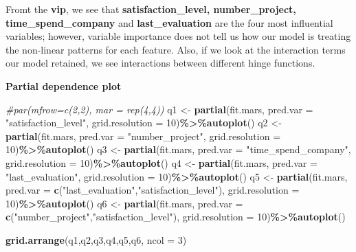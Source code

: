 \documentclass[
  11pt,
]{article}
\newenvironment{Shaded}{\begin{snugshade}}{\end{snugshade}}
\newcommand{\AttributeTok}[1]{\textcolor[rgb]{0.13,0.29,0.53}{#1}}
\newcommand{\CommentTok}[1]{\textcolor[rgb]{0.56,0.35,0.01}{\textit{#1}}}
\newcommand{\DecValTok}[1]{\textcolor[rgb]{0.00,0.00,0.81}{#1}}
\newcommand{\FunctionTok}[1]{\textcolor[rgb]{0.13,0.29,0.53}{\textbf{#1}}}
\newcommand{\NormalTok}[1]{#1}
\newcommand{\OtherTok}[1]{\textcolor[rgb]{0.56,0.35,0.01}{#1}}
\newcommand{\SpecialCharTok}[1]{\textcolor[rgb]{0.81,0.36,0.00}{\textbf{#1}}}
\newcommand{\StringTok}[1]{\textcolor[rgb]{0.31,0.60,0.02}{#1}}
\begin{document}
Fromt the \textbf{vip}, we see that \textbf{satisfaction\_level,
number\_project, time\_spend\_company} and \textbf{last\_evaluation} are
the four most influential variables; however, variable importance does
not tell us how our model is treating the non-linear patterns for each
feature. Also, if we look at the interaction terms our model retained,
we see interactions between different hinge functions.

\hfill\break
\textbf{Partial dependence plot}

\begin{Shaded}
\begin{Highlighting}[]
\CommentTok{\#par(mfrow=c(2,2), mar = rep(4,4))}
\NormalTok{q1 }\OtherTok{\textless{}{-}} \FunctionTok{partial}\NormalTok{(fit.mars, }\AttributeTok{pred.var =} \StringTok{"satisfaction\_level"}\NormalTok{, }\AttributeTok{grid.resolution =} \DecValTok{10}\NormalTok{)}\SpecialCharTok{\%\textgreater{}\%}\FunctionTok{autoplot}\NormalTok{()}
\NormalTok{q2 }\OtherTok{\textless{}{-}} \FunctionTok{partial}\NormalTok{(fit.mars, }\AttributeTok{pred.var =} \StringTok{"number\_project"}\NormalTok{, }\AttributeTok{grid.resolution =} \DecValTok{10}\NormalTok{)}\SpecialCharTok{\%\textgreater{}\%}\FunctionTok{autoplot}\NormalTok{()}
\NormalTok{q3 }\OtherTok{\textless{}{-}} \FunctionTok{partial}\NormalTok{(fit.mars, }\AttributeTok{pred.var =} \StringTok{"time\_spend\_company"}\NormalTok{, }\AttributeTok{grid.resolution =} \DecValTok{10}\NormalTok{)}\SpecialCharTok{\%\textgreater{}\%}\FunctionTok{autoplot}\NormalTok{()}
\NormalTok{q4 }\OtherTok{\textless{}{-}} \FunctionTok{partial}\NormalTok{(fit.mars, }\AttributeTok{pred.var =} \StringTok{"last\_evaluation"}\NormalTok{, }\AttributeTok{grid.resolution =} \DecValTok{10}\NormalTok{)}\SpecialCharTok{\%\textgreater{}\%}\FunctionTok{autoplot}\NormalTok{()}
\NormalTok{q5 }\OtherTok{\textless{}{-}} \FunctionTok{partial}\NormalTok{(fit.mars, }\AttributeTok{pred.var =} \FunctionTok{c}\NormalTok{(}\StringTok{"last\_evaluation"}\NormalTok{,}\StringTok{"satisfaction\_level"}\NormalTok{), }
              \AttributeTok{grid.resolution =} \DecValTok{10}\NormalTok{)}\SpecialCharTok{\%\textgreater{}\%}\FunctionTok{autoplot}\NormalTok{()}
\NormalTok{q6 }\OtherTok{\textless{}{-}} \FunctionTok{partial}\NormalTok{(fit.mars, }\AttributeTok{pred.var =} \FunctionTok{c}\NormalTok{(}\StringTok{"number\_project"}\NormalTok{,}\StringTok{"satisfaction\_level"}\NormalTok{), }
              \AttributeTok{grid.resolution =} \DecValTok{10}\NormalTok{)}\SpecialCharTok{\%\textgreater{}\%}\FunctionTok{autoplot}\NormalTok{()}

\FunctionTok{grid.arrange}\NormalTok{(q1,q2,q3,q4,q5,q6, }\AttributeTok{ncol =} \DecValTok{3}\NormalTok{)}
\end{Highlighting}
\end{Shaded}
\end{document}
